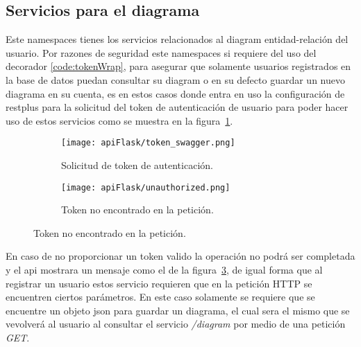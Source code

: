 \subsection{Servicios para el diagrama}

Este namespaces tienes los servicios relacionados al diagram entidad-relación del usuario. Por razones de seguridad este namespaces si requiere del uso del decorador \ref{code:tokenWrap}, para asegurar que solamente usuarios registrados en la base de datos puedan consultar su diagram o en su defecto guardar un nuevo diagrama en su cuenta, es en estos casos donde entra en uso la configuración de restplus para la solicitud del token de autenticación de usuario para poder hacer uso de estos servicios como se muestra en la figura~\ref{img:tokenSwagger}.

\begin{figure}[H]
  \begin{subfigure}[b]{0.49\textwidth}
      \texttt{[image: apiFlask/token\_swagger.png]}
      \caption{Solicitud de token de autenticación.}
      \label{img:tokenSwagger}
    \end{subfigure}
    \hfill
    \begin{subfigure}[b]{0.49\textwidth}
      \texttt{[image: apiFlask/unauthorized.png]}
      \caption{Token no encontrado en la petición.}
      \label{img:unauthorized}
    \end{subfigure}
\end{figure}

En caso de no proporcionar un token valido la operación no podrá ser completada y el api mostrara un mensaje como el de la figura~\ref{img:unauthorized}, de igual forma que al registrar un usuario estos servicio requieren que en la petición HTTP se encuentren ciertos parámetros. En este caso solamente se requiere que se encuentre un objeto json para guardar un diagrama, el cual sera el mismo que se vevolverá al usuario al consultar el servicio \textit{/diagram} por medio de una petición \textit{GET}.